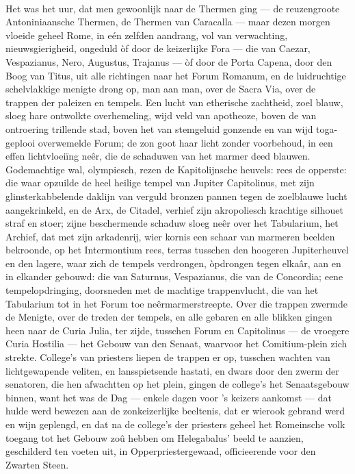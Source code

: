 \documentclass[a4paper, 12pt, oneside, dutch]{article}
\begin{document}
\paragraph{}
Het was het uur, dat men gewoonlijk naar de Thermen ging --- de reuzengroote Antoniniaansche Thermen, de Thermen van Caracalla --- maar dezen morgen vloeide geheel Rome, in eén zelfden aandrang, vol van verwachting, nieuwsgierigheid, ongeduld òf door de keizerlijke Fora --- die van Caezar, Vespazianus, Nero, Augustus, Trajanus --- òf door de Porta Capena, door den Boog van Titus, uit alle richtingen naar het Forum Romanum, en de luidruchtige schelvlakkige menigte drong op, man aan man, over de Sacra Via, over de trappen der paleizen en tempels. Een lucht van etherische zachtheid, zoel blauw, sloeg hare ontwolkte overhemeling, wijd veld van apotheoze, boven de van ontroering trillende stad, boven het van stemgeluid gonzende en van wijd toga-geplooi overwemelde Forum; de zon goot haar licht zonder voorbehoud, in een effen lichtvloeiïng neêr, die de schaduwen van het marmer deed blauwen. Godemachtige wal, olympiesch, rezen de Kapitolijnsche heuvels: rees de opperste: die waar opzuilde de heel heilige tempel van Jupiter Capitolinus, met zijn glinsterkabbelende daklijn van verguld bronzen pannen tegen de zoelblauwe lucht aangekrinkeld, en de Arx, de Citadel, verhief zijn akropoliesch krachtige silhouet straf en stoer; zijne beschermende schaduw sloeg neêr over het Tabularium, het Archief, dat met zijn arkadenrij, wier kornis een schaar van marmeren beelden bekroonde, op het Intermontium rees, terras tusschen den hoogeren Jupiterheuvel en den lagere, waar zich de tempels verdrongen, òpdrongen tegen elkaâr, aan en in elkander gebouwd: die van Saturnus, Vespazianus, die van de Concordia; eene tempelopdringing, doorsneden met de machtige trappenvlucht, die van het Tabularium tot in het Forum toe neêrmarmerstreepte. Over die trappen zwermde de Menigte, over de treden der tempels, en alle gebaren en alle blikken gingen heen naar de Curia Julia, ter zijde, tusschen Forum en Capitolinus --- de vroegere Curia Hostilia --- het Gebouw van den Senaat, waarvoor het Comitium-plein zich strekte. College's van priesters liepen de trappen er op, tusschen wachten van lichtgewapende veliten, en lansspietsende hastati, en dwars door den zwerm der senatoren, die hen afwachtten op het plein, gingen de college's het Senaatsgebouw binnen, want het was de Dag --- enkele dagen voor 's keizers aankomst --- dat hulde werd bewezen aan de zonkeizerlijke beeltenis, dat er wierook gebrand werd en wijn geplengd, en dat na de college's der priesters geheel het Romeinsche volk toegang tot het Gebouw zoû hebben om Helegabalus' beeld te aanzien, geschilderd ten voeten uit, in Opperpriestergewaad, officieerende voor den Zwarten Steen.
\end{document}
